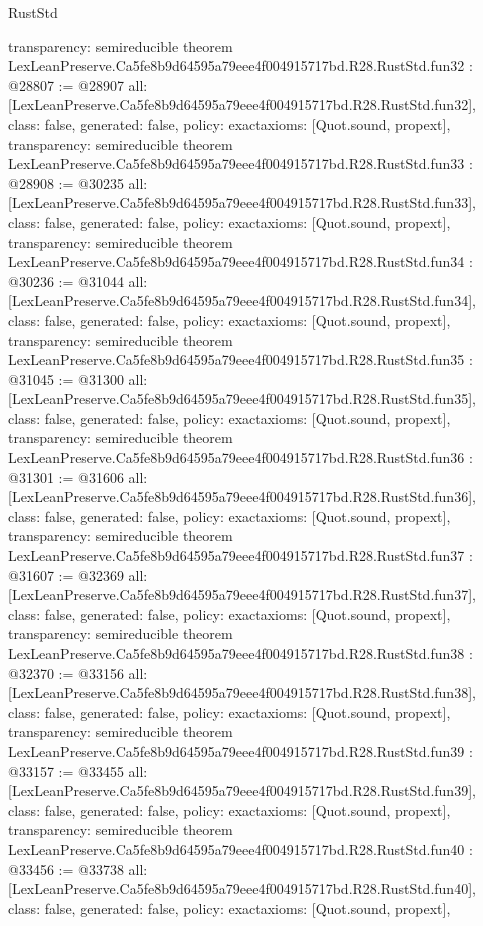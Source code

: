 \begin{lexlean}{RustStd}
\begin{coremodule}
{  transparency: semireducible
}
theorem LexLeanPreserve.Ca5fe8b9d64595a79eee4f004915717bd.R28.RustStd.fun32 : @28807 := @28907 {
  all: [LexLeanPreserve.Ca5fe8b9d64595a79eee4f004915717bd.R28.RustStd.fun32],
  class: false,
  generated: false,
  policy: exact{axioms: [Quot.sound, propext]},
  transparency: semireducible
}
theorem LexLeanPreserve.Ca5fe8b9d64595a79eee4f004915717bd.R28.RustStd.fun33 : @28908 := @30235 {
  all: [LexLeanPreserve.Ca5fe8b9d64595a79eee4f004915717bd.R28.RustStd.fun33],
  class: false,
  generated: false,
  policy: exact{axioms: [Quot.sound, propext]},
  transparency: semireducible
}
theorem LexLeanPreserve.Ca5fe8b9d64595a79eee4f004915717bd.R28.RustStd.fun34 : @30236 := @31044 {
  all: [LexLeanPreserve.Ca5fe8b9d64595a79eee4f004915717bd.R28.RustStd.fun34],
  class: false,
  generated: false,
  policy: exact{axioms: [Quot.sound, propext]},
  transparency: semireducible
}
theorem LexLeanPreserve.Ca5fe8b9d64595a79eee4f004915717bd.R28.RustStd.fun35 : @31045 := @31300 {
  all: [LexLeanPreserve.Ca5fe8b9d64595a79eee4f004915717bd.R28.RustStd.fun35],
  class: false,
  generated: false,
  policy: exact{axioms: [Quot.sound, propext]},
  transparency: semireducible
}
theorem LexLeanPreserve.Ca5fe8b9d64595a79eee4f004915717bd.R28.RustStd.fun36 : @31301 := @31606 {
  all: [LexLeanPreserve.Ca5fe8b9d64595a79eee4f004915717bd.R28.RustStd.fun36],
  class: false,
  generated: false,
  policy: exact{axioms: [Quot.sound, propext]},
  transparency: semireducible
}
theorem LexLeanPreserve.Ca5fe8b9d64595a79eee4f004915717bd.R28.RustStd.fun37 : @31607 := @32369 {
  all: [LexLeanPreserve.Ca5fe8b9d64595a79eee4f004915717bd.R28.RustStd.fun37],
  class: false,
  generated: false,
  policy: exact{axioms: [Quot.sound, propext]},
  transparency: semireducible
}
theorem LexLeanPreserve.Ca5fe8b9d64595a79eee4f004915717bd.R28.RustStd.fun38 : @32370 := @33156 {
  all: [LexLeanPreserve.Ca5fe8b9d64595a79eee4f004915717bd.R28.RustStd.fun38],
  class: false,
  generated: false,
  policy: exact{axioms: [Quot.sound, propext]},
  transparency: semireducible
}
theorem LexLeanPreserve.Ca5fe8b9d64595a79eee4f004915717bd.R28.RustStd.fun39 : @33157 := @33455 {
  all: [LexLeanPreserve.Ca5fe8b9d64595a79eee4f004915717bd.R28.RustStd.fun39],
  class: false,
  generated: false,
  policy: exact{axioms: [Quot.sound, propext]},
  transparency: semireducible
}
theorem LexLeanPreserve.Ca5fe8b9d64595a79eee4f004915717bd.R28.RustStd.fun40 : @33456 := @33738 {
  all: [LexLeanPreserve.Ca5fe8b9d64595a79eee4f004915717bd.R28.RustStd.fun40],
  class: false,
  generated: false,
  policy: exact{axioms: [Quot.sound, propext]},
}
\end{coremodule}
\end{lexlean}
